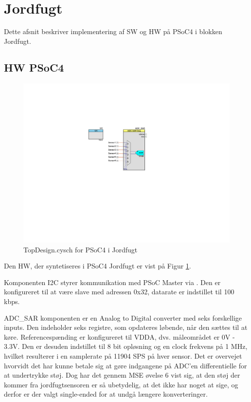 \section{Jordfugt} \label{sec:JrdImpl}

Dette afsnit beskriver implementering af SW og HW på PSoC4 i blokken Jordfugt. 

\subsection{HW PSoC4}
\begin{figure}[h]
\centering 
\includegraphics[width={\textwidth-6cm}, trim = 250 270 310 160, clip=true] {../fig/TopDesign_Jordfugt.pdf}
\caption{TopDesign.cysch for PSoC4 i Jordfugt}
\label{fig:topdesign_jordfugt}
\end{figure}

Den HW, der syntetiseres i PSoC4 Jordfugt er vist på Figur \ref{fig:topdesign_jordfugt}. 

Komponenten I2C styrer kommunikation med PSoC Master via \IIC. 
Den er konfigureret til at være slave med adressen 0x32, datarate er indstillet til 100 kbps.

ADC\_SAR komponenten er en Analog to Digital converter med seks forskellige inputs. Den indeholder seks registre, som opdateres løbende, når den sættes til at køre. Referencespænding er konfigureret til VDDA, dvs. måleområdet er 0V - 3.3V.
Den er desuden indstillet til 8 bit opløsning og en clock frekvens på 1 MHz, hvilket resulterer i en samplerate på 11904 SPS på hver sensor.
Det er overvejet hvorvidt det har kunne betale sig at gøre indgangene på ADC'en differentielle for at undertrykke støj. Dog har det gennem MSE øvelse 6 \cite{lib:MSE_06} vist sig, at den støj der kommer fra jordfugtsensoren er så ubetydelig, at det ikke har noget at sige, og derfor er der valgt single-ended for at undgå længere konverteringer.


